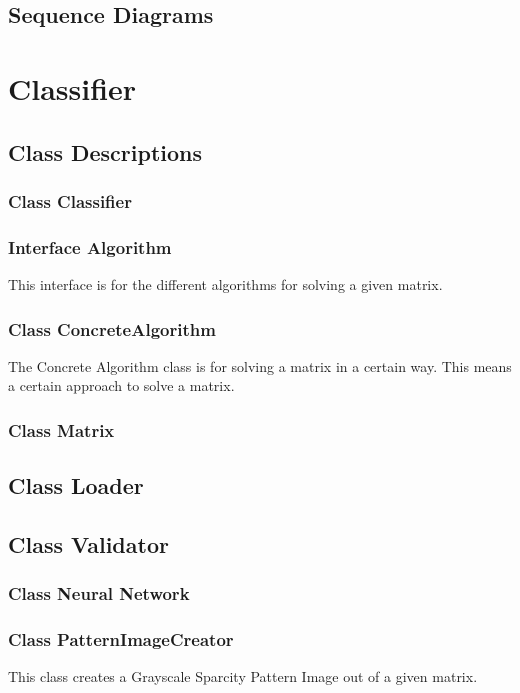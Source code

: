 \documentclass[parskip=full]{scrartcl}
\begin{document}
\subsection{Sequence Diagrams}


\section{Classifier}

\subsection{Class Descriptions}

\subsubsection{Class Classifier}
\subsubsection{Interface Algorithm}
This interface is for the different algorithms for solving a given matrix.
\subsubsection{Class ConcreteAlgorithm}
The Concrete Algorithm class is for solving a matrix in a certain way.
This means a certain approach to solve a matrix.
\subsubsection{Class Matrix}

\subsection{Class Loader}

\subsection{Class Validator}

\subsubsection{Class Neural Network}

\subsubsection{Class PatternImageCreator}
This class creates a Grayscale Sparcity Pattern Image out of a given matrix.
\end{document}
